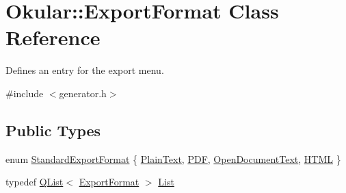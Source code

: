\hypertarget{classOkular_1_1ExportFormat}{\section{Okular\+:\+:Export\+Format Class Reference}
\label{classOkular_1_1ExportFormat}
}


Defines an entry for the export menu.  




{\ttfamily \#include $<$generator.\+h$>$}

\subsection*{Public Types}
\begin{DoxyCompactItemize}
\item 
enum \hyperlink{classOkular_1_1ExportFormat_af030ecc6c77b5cdd89cd1bc4a894c6f2}{Standard\+Export\+Format} \{ \hyperlink{classOkular_1_1ExportFormat_af030ecc6c77b5cdd89cd1bc4a894c6f2ad7daf23a3915d800df9de1b417a4b65a}{Plain\+Text}, 
\hyperlink{classOkular_1_1ExportFormat_af030ecc6c77b5cdd89cd1bc4a894c6f2a282bea2bc8da48d30988d1286571c671}{P\+D\+F}, 
\hyperlink{classOkular_1_1ExportFormat_af030ecc6c77b5cdd89cd1bc4a894c6f2a82b7e76dc44580c9742e6e41042892f3}{Open\+Document\+Text}, 
\hyperlink{classOkular_1_1ExportFormat_af030ecc6c77b5cdd89cd1bc4a894c6f2a7d2fa80544cea061db29c01e973131c0}{H\+T\+M\+L}
 \}
\item 
typedef \hyperlink{classQList}{Q\+List}$<$ \hyperlink{classOkular_1_1ExportFormat}{Export\+Format} $>$ \hyperlink{classOkular_1_1ExportFormat_a987d72c1a1456b8a983a37603a8fa78d}{List}
\end{DoxyCompactItemize}
